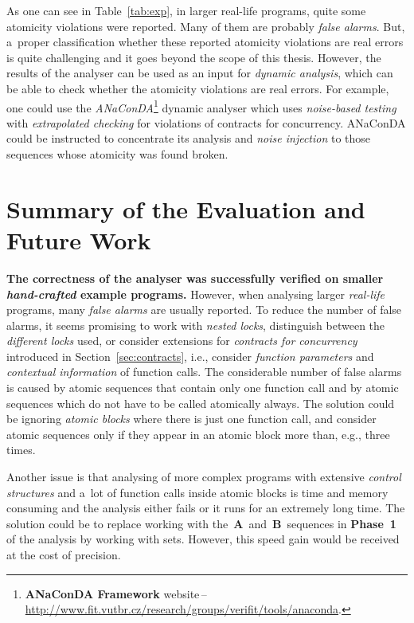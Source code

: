 As one can see in Table~\ref{tab:exp}, in larger real-life programs,
quite some atomicity violations were reported. Many of them are
probably \emph{false alarms}. But, a~proper classification whether
these reported atomicity violations are real errors is quite
challenging and it goes beyond the scope of this thesis. However, the
results of the analyser can be used as an input for \emph{dynamic analysis},
which can be able to check whether the atomicity violations are real
errors. For example, one could use the
\emph{ANaConDA}\footnote{\textbf{ANaConDA Framework} website\,--\,%
\url{http://www.fit.vutbr.cz/research/groups/verifit/tools/anaconda}.}
dynamic analyser which uses \emph{noise-based testing} with
\emph{extrapolated checking} for violations of contracts for concurrency.
ANaConDA could be instructed to concentrate its analysis and \emph{noise
injection} to those sequences whose atomicity was found broken.


\section{Summary of the Evaluation and Future Work}
\label{sec:expSum}

\textbf{The correctness of the analyser was successfully verified on smaller
\emph{hand-crafted} example programs.} However, when analysing larger
\emph{real-life} programs, many \emph{false alarms} are usually reported.
To reduce the number of false alarms, it seems promising to work with
\emph{nested locks}, distinguish between the \emph{different locks} used,
or consider extensions for \emph{contracts for concurrency} introduced in
Section~\ref{sec:contracts}, i.e., consider \emph{function parameters} and
\emph{contextual information} of function calls. The considerable
number of false alarms is caused by atomic sequences that contain only
one function call and by atomic sequences which do not have to be called
atomically always. The solution could be ignoring \emph{atomic blocks} where
there is just one function call, and consider atomic sequences only if
they appear in an atomic block more than, e.g., three times.

Another issue is that analysing of more complex programs with extensive
\emph{control structures} and a~lot of function calls inside atomic blocks
is time and memory consuming and the analysis either fails or it
runs for an extremely long time. The solution could be to replace
working with the~\textbf{A}~and~\textbf{B}~sequences in \textbf{Phase~1} of
the analysis by working with sets. However, this speed gain would be
received at the cost of precision.



